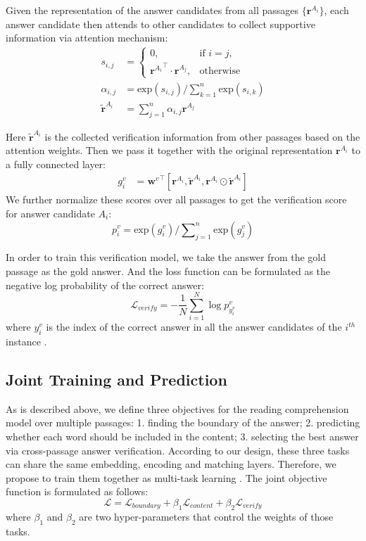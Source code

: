 \documentclass[11pt,a4paper]{article}
\renewcommand{\vec}[1]{\mathbf{#1}}
\begin{document}
Given the representation of the answer candidates from all passages $\{\vec{r}^{A_{i}}\}$, each answer candidate then attends to other candidates to collect supportive information via attention mechanism:
\begin{align}
	s_{i, j} &= 
	 \begin{cases}
 		0, & \text{if } i=j, \\
 		{\vec{r}^{A_i}}^{\intercal} \cdot \vec{r}^{A_j},  & \text{otherwise}	
 \end{cases}
 \\
	{\alpha}_{i, j} &= \textrm{exp} (s_{i, j}) / \sum\nolimits_{k=1}^{n} \textrm{exp} (s_{i, k}) \\
	\vec{\tilde{r}}^{A_i} &= \sum\nolimits_{j=1}^{n} {\alpha}_{i, j}\vec{r}^{A_j}
\end{align}


Here $\vec{\tilde{r}}^{A_{i}}$ is the collected verification information from other passages based on the attention weights. Then we pass it together with the original representation $\vec{r}^{A_{i}}$ to a fully connected layer:
\begin{align}
	g_{i}^v &= {\vec{w}^v}^{\intercal} [\vec{r}^{A_i}, \vec{\tilde{r}}^{A_i}, \vec{r}^{A_i} \odot \vec{\tilde{r}}^{A_i} ]
\end{align}
We further normalize these scores over all passages to get the verification score for answer candidate $A_i$:
\begin{equation}
p_i^v = \textrm{exp} (g_i^v) / \sum\nolimits_{j=1}^{n} \textrm{exp} (g_j^v)
\end{equation}


In order to train this verification model, we take the answer from the gold passage as the gold answer. And the loss function can be formulated as the negative log probability of the correct answer:
\begin{equation}
	\mathcal{L}_{verify} = - \frac{1}{N} \sum_{i=1}^N \log p_{y_i^v}^{v}
\end{equation}
where $y_i^v$ is the index of the correct answer in all the answer candidates of the $i^{th}$ instance . 

\subsection{Joint Training and Prediction}
\label{train}

As is described above, we define three objectives for the reading comprehension model over multiple passages: 1. finding the boundary of the answer; 2. predicting whether each word should be included in the content; 3. selecting the best answer via cross-passage answer verification. According to our design, these three tasks can share the same embedding, encoding and matching layers. Therefore, we propose to train them together as multi-task learning \cite{multi-task}. The joint objective function is formulated as follows:
\begin{equation}
	\mathcal{L} = \mathcal{L}_{boundary} + \beta_{1} \mathcal{L}_{content} + \beta_{2} \mathcal{L}_{verify}
\end{equation}
where $\beta_1$ and $\beta_2$ are two hyper-parameters that control the weights of those tasks.
\end{document}
